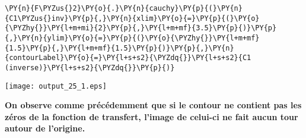 \begin{tcolorbox}[breakable, size=fbox, boxrule=1pt, pad at break*=1mm,colback=cellbackground, colframe=cellborder]
\begin{Verbatim}[commandchars=\\\{\}]
\PY{n}{F\PYZus{}2}\PY{o}{.}\PY{n}{cauchy}\PY{p}{(}\PY{n}{C1\PYZus{}inv}\PY{p}{,}\PY{n}{xlim}\PY{o}{=}\PY{p}{(}\PY{o}{\PYZhy{}}\PY{l+m+mi}{2}\PY{p}{,}\PY{l+m+mf}{3.5}\PY{p}{)}\PY{p}{,}\PY{n}{ylim}\PY{o}{=}\PY{p}{(}\PY{o}{\PYZhy{}}\PY{l+m+mf}{1.5}\PY{p}{,}\PY{l+m+mf}{1.5}\PY{p}{)}\PY{p}{,}\PY{n}{contourLabel}\PY{o}{=}\PY{l+s+s2}{\PYZdq{}}\PY{l+s+s2}{C1 (inverse)}\PY{l+s+s2}{\PYZdq{}}\PY{p}{)}
\end{Verbatim}
\end{tcolorbox}
\begin{center}
    \texttt{[image: output\_25\_1.eps]}
\end{center}
\textbf{On observe comme précédemment que si le contour ne contient pas
les zéros de la fonction de transfert, l'image de celui-ci ne fait aucun
tour autour de l'origine.} 
